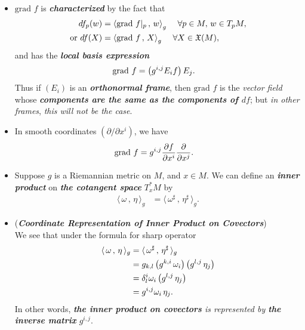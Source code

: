\documentclass[11pt]{article}
\begin{document}
\begin{itemize}
\item \begin{remark}
$\text{grad }f$ is \emph{\textbf{characterized}} by the fact that
\begin{align}
df_p(w) &= \left\langle \text{grad }f |_{p}\,,\, w \right\rangle_{g}\, \quad \forall p \in M, \, w \in T_{p}M,  \label{eqn: gradient_projection_differential}\\
\text{or }df(X) &= \left\langle \text{grad }f\,,\, X \right\rangle_{g}\, \quad \forall X  \in {\mathfrak X}(M),  \nonumber
\end{align} and has the \textit{\textbf{local basis expression}}
\begin{align}
\text{grad }f&= \left(g^{i,j}E_i f\right) E_j. \label{eqn: gradient_coordinate_representation}
\end{align} Thus if $(E_i)$ is an \emph{\textbf{orthonormal frame}}, then $\text{grad }f$ is the \emph{vector field} whose \emph{\textbf{components are the same as the components of $df$}}; but \emph{in other frames}, \emph{this will not be the case}. 
\end{remark}

\item \begin{remark}
In smooth coordinates $(\partial / \partial x^i)$, we have
\begin{align}
\text{grad }f&= g^{i,j}\frac{\partial f}{ \partial x^i}\frac{\partial }{ \partial x^j}. \label{eqn: gradient_coordinate_representation_2}
\end{align}
\end{remark}

\item \begin{definition}
Suppose $g$ is a Riemannian metric on $M$, and $x \in M$. We can define an \emph{\textbf{inner product}} on \emph{\textbf{the cotangent space}} $T_{x}^{*}M$ by
\begin{align*}
\langle\,\omega\,,\,\eta\,\rangle_g &= \langle\,\omega^{\sharp}\,,\,\eta^{\sharp}\,\rangle_g.
\end{align*}
\end{definition}

\item \begin{remark} (\emph{\textbf{Coordinate Representation of Inner Product on Covectors}})\\
We see that under the formula for sharp operator
\begin{align*}
\langle\,\omega\,,\,\eta\,\rangle_g &= \langle\,\omega^{\sharp}\,,\,\eta^{\sharp}\,\rangle_g\\
&= g_{k,l}\left(g^{k,i}\,\omega_{i}\right)\left(g^{l,j}\,\eta_{j}\right)\\
&= \delta_{l}^{i}\omega_i\left(g^{l,j}\,\eta_{j}\right) \\
&= g^{i,j}\omega_{i}\,\eta_{j}.
\end{align*} In other words, \emph{\textbf{the inner product on covectors} is represented by \textbf{the inverse matrix} $g^{i,j}$}. 
\end{remark}


\end{itemize}
\end{document}
